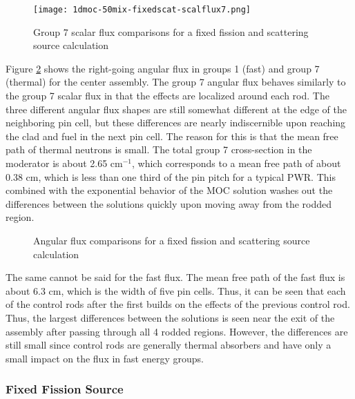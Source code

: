 \begin{figure}[H]
    \centering
    \texttt{[image: 1dmoc-50mix-fixedscat-scalflux7.png]}
    \caption{Group 7 scalar flux comparisons for a fixed fission and scattering source calculation}\label{f:1dmoc-fixed-50-scalflux7}
\end{figure}

Figure \ref{f:1dmoc-fixed-50-angflux} shows the right-going angular flux in groups 1 (fast) and group 7 (thermal) for the center assembly.  The group 7 angular flux behaves similarly to the group 7 scalar flux in that the effects are localized around each rod.  The three different angular flux shapes are still somewhat different at the edge of the neighboring pin cell, but these differences are nearly indiscernible upon reaching the clad and fuel in the next pin cell.  The reason for this is that the mean free path of thermal neutrons is small.  The total group 7 cross-section in the moderator is about 2.65 cm$^{-1}$, which corresponds to a mean free path of about 0.38 cm, which is less than one third of the pin pitch for a typical PWR.  This combined with the exponential behavior of the MOC solution washes out the differences between the solutions quickly upon moving away from the rodded region.

\begin{figure}[H]
    \centering
    \hfill
    \caption{Angular flux comparisons for a fixed fission and scattering source calculation}\label{f:1dmoc-fixed-50-angflux}
\end{figure}

The same cannot be said for the fast flux.  The mean free path of the fast flux is about 6.3 cm, which is the width of five pin cells.  Thus, it can be seen that each of the control rods after the first builds on the effects of the previous control rod.  Thus, the largest differences between the solutions is seen near the exit of the assembly after passing through all 4 rodded regions.  However, the differences are still small since control rods are generally thermal absorbers and have only a small impact on the flux in fast energy groups.

\subsubsection{Fixed Fission Source}

